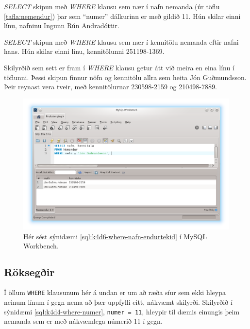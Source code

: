 \begin{example}
\caption[SELECT með WHERE klausu - eftir númeri]{\emph{SELECT} skipun með \emph{WHERE} klausu sem nær í nafn nemanda (úr töflu \ref{tafla:nemendur}) þar sem ``numer'' dálkurinn er með gildið 11. Hún skilar einni línu, nafninu Ingunn Rún Andradóttir.}
\label{sql:k4d4-where-numer}
\centering
{}
\end{example}

\begin{example}
\caption[SELECT með WHERE klausu - eftir nafni]{\emph{SELECT} skipun með \emph{WHERE} klausu sem nær í kennitölu nemanda eftir nafni hans. Hún skilar einni línu, kennitölunni 251198-1369.}
\label{sql:k4d5-where-nafn}
\centering
{}
\end{example}

\begin{example}
\caption[SELECT með WHERE klausu - endurtekin gildi]{Skilyrðið sem sett er fram í \emph{WHERE} klausu getur átt við meira en eina línu í töflunni. Þessi skipun finnur nöfn og kennitölu allra sem heita Jón Guðmundsson. Þeir reynast vera tveir, með kennitölurnar 230598-2159 og 210498-7889.}
\label{sql:k4d6-where-nafn-endurtekid}
\centering
{}
\end{example}

\begin{figure}[h]
\caption[Niðurstöður margra dálka SELECT í Workbench]{Hér sést sýnidæmi \ref{sql:k4d6-where-nafn-endurtekid} í MySQL Workbench.}
\label{mynd:workbench-nidurstada-jon}
\centering
\includegraphics[width=\linewidth]{myndir/workbench-nidurstada-jon}
\end{figure}
\subsection{Röksegðir}
\label{undirkafli:roksegdir}
Í öllum \verb|WHERE| klausunum hér á undan er um að ræða síur sem ekki hleypa neinum línum í gegn nema að þær uppfylli eitt, nákvæmt skilyrði. Skilyrðið í sýnidæmi \ref{sql:k4d4-where-numer}, \verb|numer = 11|, hleypir til dæmis einungis þeim nemanda sem er með nákvæmlega númerið 11 í gegn.

